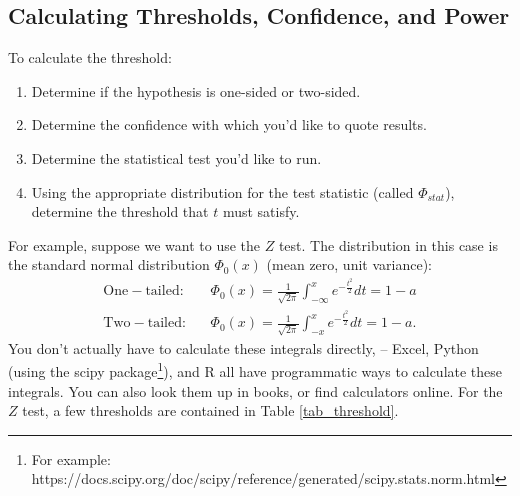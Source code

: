 \documentclass{article}
\numberwithin{equation}{section}
\begin{document}
\subsection{Calculating Thresholds, Confidence, and Power}

To calculate the threshold:
\begin{enumerate}
	\item Determine if the hypothesis is one-sided or two-sided.
	\item Determine the confidence with which you'd like to quote results.
	\item Determine the statistical test you'd like to run.
	\item Using the appropriate distribution for the test statistic (called $\Phi_{stat}$), determine the threshold that $t$ must satisfy.
\end{enumerate}
For example, suppose we want to use the $Z$ test. The distribution in this case is the standard normal distribution $\Phi_0(x)$ (mean zero, unit variance):
\begin{eqnarray}
	\mathrm{One-tailed:} && \Phi_0(x) = \frac{1}{\sqrt{2\pi}} \int_{-\infty}^x e^{-\frac{t^2}{2}} dt = 1-a\\
	\mathrm{Two-tailed:} && \Phi_0(x) = \frac{1}{\sqrt{2\pi}} \int_{-x}^x e^{-\frac{t^2}{2}} dt = 1-a.
\end{eqnarray}
You don't actually have to calculate these integrals directly, -- Excel, Python (using the scipy package\footnote{For example: https://docs.scipy.org/doc/scipy/reference/generated/scipy.stats.norm.html}), and R all have programmatic ways to calculate these integrals. You can also look them up in books, or find calculators online. For the $Z$ test, a few thresholds are contained in Table \ref{tab_threshold}.
\end{document}
